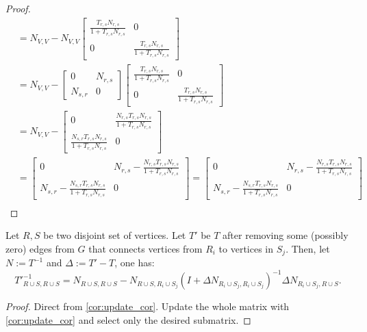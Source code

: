 \begin{proof}
\begin{align*}
        &= N_{V, V} - N_{V, V} \begin{bmatrix} \frac{T_{r, s} N_{r, s}}{1 + T_{r, s} N_{r, s}} & 0 \\ 0 & \frac{T_{r, s} N_{r, s}}{1 + T_{r, s} N_{r, s}} \end{bmatrix} \\
        &= N_{V, V} - \begin{bmatrix} 0 & N_{r, s} \\ N_{s, r} & 0 \end{bmatrix} \begin{bmatrix} \frac{T_{r, s} N_{r, s}}{1 + T_{r, s} N_{r, s}} & 0 \\ 0 & \frac{T_{r, s} N_{r, s}}{1 + T_{r, s} N_{r, s}} \end{bmatrix} \\
        &= N_{V, V} - \begin{bmatrix} 0 & \frac{N_{r, s} T_{r, s} N_{r, s}}{1 + T_{r, s} N_{r, s}} \\ \frac{N_{s, r} T_{r, s} N_{r, s}}{1 + T_{r, s} N_{r, s}} & 0 \end{bmatrix} \\
        &= \begin{bmatrix} 0 & N_{r, s} - \frac{N_{r, s} T_{r, s} N_{r, s}}{1 + T_{r, s} N_{r, s}} \\ N_{s, r} - \frac{N_{s, r} T_{r, s} N_{r, s}}{1 + T_{r, s} N_{r, s}} & 0 \end{bmatrix} 
        = \begin{bmatrix} 0 & N_{r, s} - \frac{N_{r, s} T_{r, s} N_{r, s}}{1 + T_{r, s} N_{r, s}} \\ N_{s, r} - \frac{N_{s, r} T_{r, s} N_{r, s}}{1 + T_{r, s} N_{r, s}} & 0 \end{bmatrix} \\
    \end{align*}
\end{proof}

\begin{theorem}[Update 2]
\label{update:2}
    Let \(R, S\) be two disjoint set of vertices. Let \(T'\) be \(T\) after removing some (possibly zero) edges from \(G\) that connects vertices from \(R_i\) to vertices in \(S_j\).
    Then, let \(N := T^{-1}\) and \(\Delta := T' - T\), one has:
    \[
        {T'}^{-1}_{R \cup S, R \cup S} = N_{R \cup S, R \cup S} - N_{R \cup S, R_i \cup S_j}(I + \Delta N_{R_i \cup S_j, R_i \cup S_j})^{-1} \Delta N_{R_i \cup S_j, R \cup S}.
    \]
\end{theorem}

\begin{proof}
    Direct from \cref{cor:update_cor}. Update the whole matrix with \ref{cor:update_cor} and select only the desired submatrix.
\end{proof}

